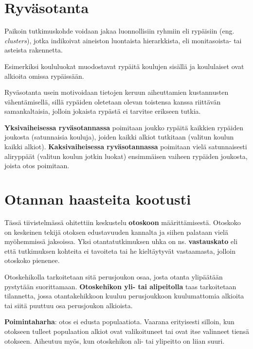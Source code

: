 \documentclass[
]{report}
\begin{document}
\hypertarget{ryvuxe4sotanta}{%
\section{Ryväsotanta}\label{ryvuxe4sotanta}}

Paikoin tutkimuskohde voidaan jakaa luonnollisiin ryhmiin eli rypäisiin
(eng. \emph{clusters}), jotka indikoivat aineiston luontaista
hierarkkista, eli monitasoista- tai asteista rakennetta.

Esimerkiksi koululuokat muodostavat rypäitä koulujen sisällä ja
koululaiset ovat alkioita omissa rypäissään.

Ryväsotanta usein motivoidaan tietojen keruun aiheuttamien kustannusten
vähentämisellä, sillä rypäiden oletetaan olevan toistensa kanssa
riittävän samankaltaisia, jolloin jokaista rypästä ei tarvitse erikseen
tutkia.

\textbf{Yksivaiheisessa ryväsotannassa} poimitaan joukko rypäitä
kaikkien rypäiden joukosta (satunnaisia kouluja), joiden kaikki alkiot
tutkitaan (valitun koulun kaikki alkiot). \textbf{Kaksivaiheisessa
ryväsotannassa} poimitaan vielä satunnaisesti aliryppäät (valitun koulun
jotkin luokat) ensimmäisen vaiheen rypäiden joukosta, joista otos
poimitaan.

\hypertarget{otannan-haasteita-kootusti}{%
\section{Otannan haasteita kootusti}\label{otannan-haasteita-kootusti}}

Tässä tiivistelmässä ohitettiin keskustelu \textbf{otoskoon}
määrittämisestä. Otoskoko on keskeinen tekijä otoksen edustavuuden
kannalta ja siihen palataan vielä myöhemmissä jaksoissa. Yksi
otantatutkimuksen uhka on ns. \textbf{vastauskato} eli että tutkimuksen
kohteita ei tavoiteta tai he kieltäytyvät vastaamasta, jolloin otoskoko
pienenee.

Otoskehikolla tarkoitetaan sitä perusjoukon osaa, josta otanta
ylipäätään pystytään suorittamaan. \textbf{Otoskehikon yli- tai
alipeitolla} taas tarkoitetaan tilannetta, jossa otantakehikkoon kuuluu
perusjoukkoon kuulumattomia alkioita tai siitä puuttuu osa perusjoukon
alkioista.

\textbf{Poimintaharha}: otos ei edusta populaatiota. Vaarana erityisesti
silloin, kun otokseen tulleet populaation alkiot ovat valikoituneet tai
ovat itse valinneet tiensä otokseen. Aiheutuu myös, kun otoskehikon ali-
tai ylipeitto on liian suuri.
\end{document}
